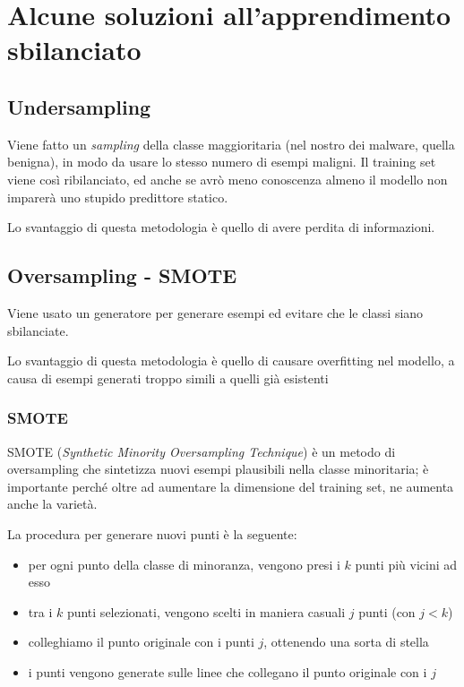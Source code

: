 \documentclass{report}
\begin{document}
\newpage
\section{Alcune soluzioni all'apprendimento \\ sbilanciato}

\subsection{Undersampling}

Viene fatto un \textit{sampling} della classe maggioritaria (nel nostro dei malware, quella benigna), in modo da usare lo stesso numero 
di esempi maligni. Il training set viene così ribilanciato, ed anche se avrò meno conoscenza almeno il modello non imparerà uno 
stupido predittore statico.

\noindent Lo svantaggio di questa metodologia è quello di avere perdita di informazioni.

\subsection{Oversampling - SMOTE}

Viene usato un generatore per generare esempi ed evitare che le classi siano sbilanciate.

\noindent Lo svantaggio di questa metodologia è quello di causare overfitting nel modello, a causa di esempi generati troppo simili 
a quelli già esistenti 

\subsubsection{SMOTE}

\noindent SMOTE (\textit{Synthetic Minority Oversampling Technique}) è un metodo di oversampling che sintetizza nuovi esempi 
plausibili nella classe minoritaria; è importante perché oltre ad aumentare la dimensione del training set, ne aumenta anche la varietà.

La procedura per generare nuovi punti è la seguente:
\begin{itemize}
    \item per ogni punto della classe di minoranza, vengono presi i $k$ punti più vicini ad esso 
    \item tra i $k$ punti selezionati, vengono scelti in maniera casuali $j$ punti (con $j<k$)
    \item colleghiamo il punto originale con i punti $j$, ottenendo una sorta di stella 
    \item i punti vengono generate sulle linee che collegano il punto originale con i $j$
\end{itemize} 
\end{document}
